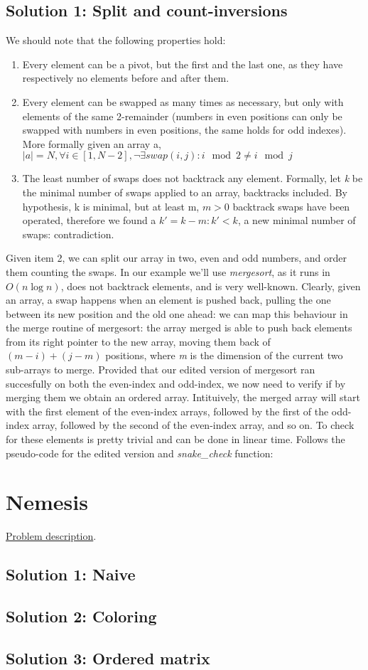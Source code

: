 \documentclass{article}
\begin{document}
\subsection{Solution 1: Split and count-inversions}
We should note that the following properties hold:
\begin{enumerate}
    \item Every element can be a pivot, but the first and the last one, as they have respectively
    no elements before and after them.
    \item Every element can be swapped as many times as necessary, but only with elements of the
    same 2-remainder (numbers in even positions can only be swapped with numbers in even positions,
    the same holds for odd indexes).
    More formally given an array a, $|a| = N, \forall i \in [1, N - 2], \neg \exists swap(i, j): i \mod 2 \neq i \mod j$
    \item The least number of swaps does not backtrack any element. Formally, let \emph{k} be the minimal number
    of swaps applied to an array, backtracks included. By hypothesis, k is minimal, but at least m,
    $m > 0$ backtrack swaps have been operated, therefore we found a $k' = k - m: k' < k$, a new minimal number
    of swaps: contradiction.
\end{enumerate}
Given item 2, we can split our array in two, even and odd numbers, and order them counting the swaps.
In our example we'll use \emph{mergesort}, as it runs in $O(n \log n)$, does not backtrack elements,
and is very well-known.
Clearly, given an array, a swap happens when an element is pushed back, pulling the one between its new position
and the old one ahead: we can map this behaviour in the merge routine of mergesort: the array merged is able to
push back elements from its right pointer to the new array, moving them back of $(m - i) + (j - m)$ positions,
where \emph{m} is the dimension of the current two sub-arrays to merge.
Provided that our edited version of mergesort ran succesfully on both the even-index and odd-index, we now need
to verify if by merging them we obtain an ordered array.
Intituively, the merged array will start with the first element of the even-index arrays, followed by the first
of the odd-index array, followed by the second of the even-index array, and so on.
To check for these elements is pretty trivial and can be done in linear time.
Follows the pseudo-code for the edited version and \emph{snake_check} function:

\section{Nemesis}
\href{http://didawiki.cli.di.unipi.it/lib/exe/fetch.php/magistraleinformatica/alg2/algo2_16/nemesi.pdf}{Problem description}.
\subsection{Solution 1: Naive}

\subsection{Solution 2: Coloring}

\subsection{Solution 3: Ordered matrix}
\end{document}
